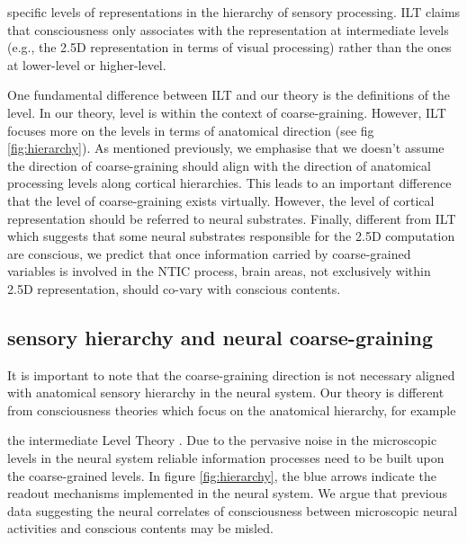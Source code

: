 \documentclass[utf8]{article}
\begin{document}
    		
    		
    		specific levels of representations in the hierarchy of sensory processing. ILT claims that consciousness only associates with the representation at intermediate levels (e.g., the 2.5D representation in terms of visual processing) rather than the ones at lower-level or higher-level. 
    		
    		
    		One fundamental difference between ILT and our theory is the definitions of the level. In our theory, level is within the context of coarse-graining. However, ILT focuses more on the levels in terms of anatomical direction (see fig \ref{fig:hierarchy}). As mentioned previously, we emphasise that we doesn't assume the direction of coarse-graining should align with the direction of anatomical processing levels along cortical hierarchies. This leads to an important difference that the level of coarse-graining exists virtually. However, the level of cortical representation should be referred to neural substrates. Finally, different from ILT which suggests that some neural substrates responsible for the 2.5D computation are conscious, we predict that once information carried by coarse-grained variables is involved in the NTIC process, brain areas, not exclusively within 2.5D representation, should  co-vary with conscious contents. 
    		
    		
            
    			
		\subsection{sensory hierarchy and neural coarse-graining}\label{sec:SensoryHierarchy}

        It is important to note that the coarse-graining direction is not necessary aligned with  anatomical sensory hierarchy in the neural system. Our theory is different from consciousness theories which focus on the anatomical hierarchy, for example 
        
        the intermediate Level Theory \citep[see also \ref{IntermediateLevelTheory}]{prinz2007intermediate, jackendoff1987consciousness}. Due to the pervasive noise in the microscopic levels in the neural system reliable information processes need to be built upon the coarse-grained levels. In figure \ref{fig:hierarchy}, the blue arrows indicate the readout mechanisms implemented in the neural system. We argue that previous data suggesting the neural correlates of consciousness between microscopic neural activities and conscious contents may be misled. 
\end{document}
